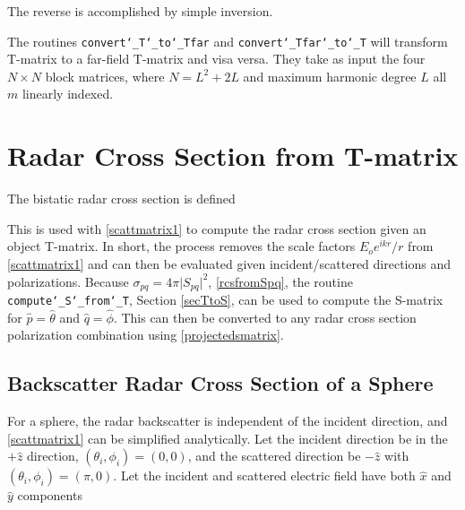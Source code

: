 The reverse is accomplished by simple inversion.

The routines  \texttt{convert\char`_T\char`_to\char`_Tfar} and  \texttt{convert\char`_Tfar\char`_to\char`_T} will transform T-matrix to a far-field T-matrix and visa versa. They take as input the four $N \times N$ block matrices, where $N = L^2 + 2L$ and maximum harmonic degree $L$ all $m$ linearly indexed.   


{\footnotesize
{}
}

{\footnotesize
{}
}



\section{Radar Cross Section from T-matrix}

The bistatic radar cross section is defined 

This is used with \eqref{scattmatrix1} to compute the radar cross section given an object T-matrix. In short, the process removes the scale factors $E_o e^{ikr}/r$ from \eqref{scattmatrix1} and can then be evaluated given incident/scattered directions and polarizations.  Because $\sigma_{pq} = 4\pi \vert S_{pq}\vert^2$, \eqref{rcsfromSpq}, the routine \texttt{compute\char`_S\char`_from\char`_T}, Section \ref{secTtoS}, can be used to compute the S-matrix for $\hat{p} = \hat{\theta}$ and $\hat{q} = \hat{\phi}$. This can then be converted to any radar cross section polarization combination using \eqref{projectedsmatrix}. 



\subsection{Backscatter Radar Cross Section of a Sphere}


For a sphere, the radar backscatter is independent of the incident direction, and \eqref{scattmatrix1} can be simplified analytically.  Let the incident direction be in the $+\hat{z}$ direction, $(\theta_i,\phi_i) = (0,0)$, and the scattered direction be $-\hat{z}$ with $(\theta_i,\phi_i) = (\pi,0)$.  Let the incident and scattered electric field have both $\hat{x}$ and $\hat{y}$ components   

